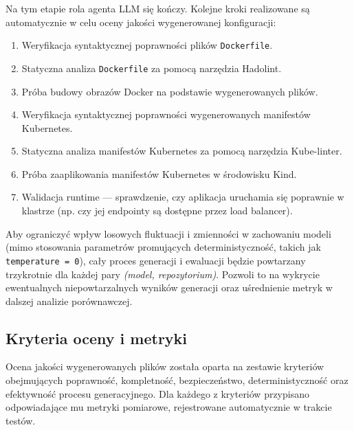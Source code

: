 Na tym etapie rola agenta LLM się kończy. Kolejne kroki realizowane są automatycznie w celu oceny jakości wygenerowanej konfiguracji:

\begin{enumerate}[resume]
    \item Weryfikacja syntaktycznej poprawności plików \texttt{Dockerfile}.
    \item Statyczna analiza \texttt{Dockerfile} za pomocą narzędzia Hadolint.
    \item Próba budowy obrazów Docker na podstawie wygenerowanych plików.
    \item Weryfikacja syntaktycznej poprawności wygenerowanych manifestów Kubernetes.
    \item Statyczna analiza manifestów Kubernetes za pomocą narzędzia Kube-linter.
    \item Próba zaaplikowania manifestów Kubernetes w środowisku Kind.
    \item Walidacja runtime — sprawdzenie, czy aplikacja uruchamia się poprawnie w klastrze (np. czy jej endpointy są dostępne przez load balancer).
\end{enumerate}

Aby ograniczyć wpływ losowych fluktuacji i zmienności w zachowaniu modeli (mimo stosowania parametrów promujących deterministyczność, takich jak \texttt{temperature = 0}), cały proces generacji i ewaluacji będzie powtarzany trzykrotnie dla każdej pary \textit{(model, repozytorium)}. Pozwoli to na wykrycie ewentualnych niepowtarzalnych wyników generacji oraz uśrednienie metryk w dalszej analizie porównawczej.

\subsection{Kryteria oceny i metryki}

Ocena jakości wygenerowanych plików została oparta na zestawie kryteriów obejmujących poprawność, kompletność, bezpieczeństwo, deterministyczność oraz efektywność procesu generacyjnego. Dla każdego z kryteriów przypisano odpowiadające mu metryki pomiarowe, rejestrowane automatycznie w trakcie testów.

